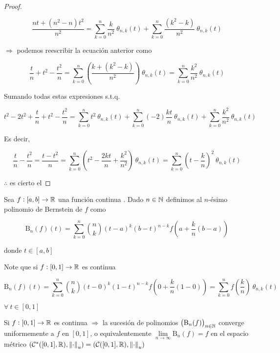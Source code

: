 \begin{proof}
\begin{enumerate}
        $$\frac{nt+(n^2-n)t^2}{n^2} = \sum\limits_{k=0}^{n} \frac{k}{n^2} \: {\theta}_{n,k} (t) + \sum\limits_{k=0}^{n} \frac{(k^2-k)}{n^2} \: {\theta}_{n,k} (t)$$

        $\Rightarrow$ podemos reescribir la ecuación anterior como

        $$\frac{t}{n}+t^2-\frac{t^2}{n} = \sum\limits_{k=0}^{n}  \left( \frac{k+(k^2-k)}{n^2}\right) \: {\theta}_{n,k} (t) =  \sum\limits_{k=0}^{n}  \frac{k^2}{n^2} \: {\theta}_{n,k} (t) $$

        Sumando todas estas expresiones s.t.q.

        $$t^2-2t^2+\frac{t}{n}+t^2-\frac{t^2}{n} = \sum\limits_{k=0}^{n} t^2 \: {\theta}_{n,k} (t)+ \sum\limits_{k=0}^{n} (-2) \frac{kt}{n}\: {\theta}_{n,k} (t) + \sum\limits_{k=0}^{n}  \frac{k^2}{n^2} \: {\theta}_{n,k} (t)$$

        Es decir, 

        $$\frac{t}{n} - \frac{t^2}{n} = \frac{t-t^2}{n} =  \sum\limits_{k=0}^{n} \left( t^2 - \frac{2kt}{n} + \frac{k^2}{n^2}\right) \: {\theta}_{n,k} (t) = \sum\limits_{k=0}^{n} {\left( t - \frac{k}{n} \right)}^{2} \: {\theta}_{n,k} (t)$$
    \end{enumerate}
    $\therefore$ es cierto el 
\end{proof}

\begin{definition} 
    Sea $f : [a,b] \to \mathbb{R}$ una función continua . Dado $n \in \mathbb{N}$ definimos al $n$-ésimo polinomio de Bernstein de $f$ como

    $$\mathrm{B}_n(f)(t) = \sum\limits_{k=0}^{n} \binom{n}{k} {(t-a)}^{k}{(b-t)}^{n-k} f\left(a+\frac{k}{n}(b-a) \right)$$

    donde $t \in [a,b]$

    Note que si $f:[0,1] \to \mathbb{R}$ es continua

    $$\mathrm{B}_n(f)(t) = \sum\limits_{k=0}^{n} \binom{n}{k} {(t-0)}^{k}{(1-t)}^{n-k} f\left(0+\frac{k}{n}(1-0) \right) = \sum\limits_{k=0}^{n} f\left( \frac{k}{n} \right) \: {\theta}_{n,k} (t)$$

    $\forall \: t \in [0,1]$
\end{definition}

\begin{theorem}  \label{theom531}
    Si $f: [0,1] \to \mathbb{R}$ es continua $\Rightarrow$ la sucesión de polinomios ${\left(\mathrm{B}_n(f)\right)}_{n \in \mathbb{N}}$ converge uniformemente a $f$ en $[0,1]$, o equivalentemente $\lim\limits_{n \to \infty} \mathrm{B}_n(f) = f$ en el espacio métrico $({\mathcal{C}}^{\ast}([0,1],\mathbb{R}), {\norm{\cdot}}_{u}) = (\mathcal{C}([0,1],\mathbb{R}), {\norm{\cdot}}_{u})$
\end{theorem}

